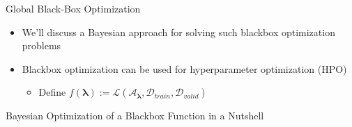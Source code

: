 \documentclass[aspectratio=169]{../latex_main/tntbeamer}  %
\newcommand{\conf}[0]{\pmb{\lambda}}
\begin{document}
\begin{frame}[c]{Global Black-Box Optimization}
\begin{itemize}
        \item We'll discuss a \alert{Bayesian} approach for solving such blackbox optimization problems
\medskip
\pause
        \item Blackbox optimization can be used for hyperparameter optimization (HPO)
   	 	\begin{itemize}
         	\item Define \alert{$f(\conf) := \mathcal{L}( \mathcal{A}_{\conf}, \mathcal{D}_{train}, \mathcal{D}_{valid} )$}
        \end{itemize}
    \end{itemize}
\end{frame}

\begin{frame}[c]{Bayesian Optimization of a Blackbox Function in a Nutshell}

\bigskip
\bigskip
\bigskip


\end{frame}
\end{document}
